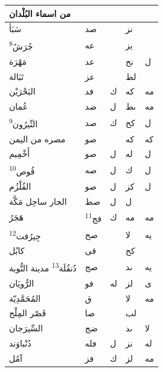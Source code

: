 \documentclass[11pt]{article}
\newcommand{\AbjadZero}{{\NallinoSigns\symbol{"E000}}}
\begin{document}
\begin{Arabic}
\begin{minipage}[t]{0.495\textwidth}
\begin{tabular}{|p{55mm}|>{\centering\arraybackslash}p{4.8mm}>{\centering\arraybackslash}p{4.8mm}|>{\centering\arraybackslash}p{4.8mm}>{\centering\arraybackslash}p{4.8mm}|}
\hline\end{tabular}\end{minipage}\hfill\begin{minipage}[t]{0.495\textwidth}\setlength{\tabcolsep}{2.2pt}\begin{tabular}{|p{55mm}|>{\centering\arraybackslash}p{4.8mm}>{\centering\arraybackslash}p{4.8mm}|>{\centering\arraybackslash}p{4.8mm}>{\centering\arraybackslash}p{4.8mm}|}\hline
\centering من اسماء البُلْدان & \multicolumn{2}{c|}{الطول} & \multicolumn{2}{c|}{العرض} \\ \hline
{}سَبَأ & صد & \AbjadZero{} & نز & \AbjadZero{} \\
{}جُرَشُ\textsuperscript{8} & عه & \AbjadZero{} & يز & \AbjadZero{} \\
{}مَهْرَة & عد & \AbjadZero{} & نح & ل \\
{}تَبَالة & عز & \AbjadZero{} & لط & \AbjadZero{} \\
{}البَحْرَيْن & فد & ك & كه & مه \\
{}عُمان & ضد & ل & ىط & مه \\
{}النِّيرُون\textsuperscript{9} & صد & ك & كح & ل \\
{}مصره من اليمن & صو & \AbjadZero{} & كه & كه \\
{}أَخْمِيم & صو & ل & له & ل \\
{}قُوص\textsuperscript{10} & صه & ل & ك & ل \\
{}القُلْزُم & صو & ل & كز & ل \\
{}الجار ساحِل مَكَّة & صط & ل & ل & \AbjadZero{} \\
{}هَجَرُ & فج\textsuperscript{11} & ك & مه & مه \\
{}جِيرُفت\textsuperscript{12} & صح & \AbjadZero{} & لا & يه \\
{}كابُل & قى & \AbjadZero{} & كح & \AbjadZero{} \\
{}دُنقُلَة\textsuperscript{13} مدينة النُّوبة & صج & \AbjadZero{} & ىد & يه \\
{}الرُّويَان & فو & له & لز & ى \\
{}المُحَمَّدِيّة & ق & \AbjadZero{} & لا & مه \\
{}قَصْر المِلْح & صا & \AbjadZero{} & لب & \AbjadZero{} \\
{}السِّيرَجان & ضج & \AbjadZero{} & ىد & لا \\
{}دُنْباوَند & ڡله & ل & نز & له \\
{}آمُل & فز & ك & لز & مه \\
\hline\end{tabular}\end{minipage}
\end{Arabic}
\end{document}

